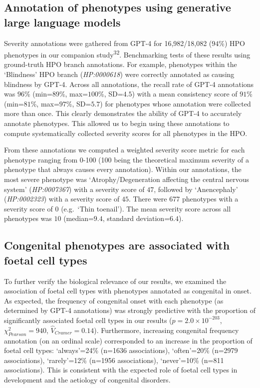\documentclass[
]{report}
\begin{document}
\subsection{Annotation of phenotypes using generative large language
models}\label{annotation-of-phenotypes-using-generative-large-language-models}

Severity annotations were gathered from GPT-4 for 16,982/18,082
(\(94\)\%) HPO phenotypes in our companion study\textsuperscript{32}.
Benchmarking tests of these results using ground-truth HPO branch
annotations. For example, phenotypes within the `Blindness' HPO branch
(\emph{HP:0000618}) were correctly annotated as causing blindness by
GPT-4. Across all annotations, the recall rate of GPT-4 annotations was
\(96\)\% (min=\(89\)\%, max=\(100\)\%, SD=\(4.5\)) with a mean
consistency score of \(91\)\% (min=\(81\)\%, max=\(97\)\%, SD=\(5.7\))
for phenotypes whose annotation were collected more than once. This
clearly demonstrates the ability of GPT-4 to accurately annotate
phenotypes. This allowed us to begin using these annotations to compute
systematically collected severity scores for all phenotypes in the HPO.

From these annotations we computed a weighted severity score metric for
each phenotype ranging from 0-100 (100 being the theoretical maximum
severity of a phenotype that always causes every annotation). Within our
annotations, the most severe phenotype was `Atrophy/Degeneration
affecting the central nervous system' (\emph{HP:0007367}) with a
severity score of \(47\), followed by `Anencephaly' (\emph{HP:0002323})
with a severity score of \(45\). There were 677 phenotypes with a
severity score of 0 (e.g.~`Thin toenail'). The mean severity score
across all phenotypes was \(10\) (median=\(9.4\), standard
deviation=\(6.4\)).

\subsection{Congenital phenotypes are associated with foetal cell
types}\label{congenital-phenotypes-are-associated-with-foetal-cell-types}

To further verify the biological relevance of our results, we examined
the association of foetal cell types with phenotypes annotated as
congenital in onset. As expected, the frequency of congenital onset with
each phenotype (as determined by GPT-4 annotations) was strongly
predictive with the proportion of significantly associated foetal cell
types in our results (\(p=\)\(2.0 \times 10^{-203}\),
\(\chi^2_{Pearson}=\)\(940\), \(\hat{V}_{Cramer}=\)\(0.14\)).
Furthermore, increasing congenital frequency annotation (on an ordinal
scale) corresponded to an increase in the proportion of foetal cell
types: `always'=24\% (n=1636 associations), `often'=20\% (n=2979
associations), `rarely'=12\% (n=1956 associations), `never'=10\% (n=811
associations). This is consistent with the expected role of foetal cell
types in development and the aetiology of congenital disorders.
\end{document}
